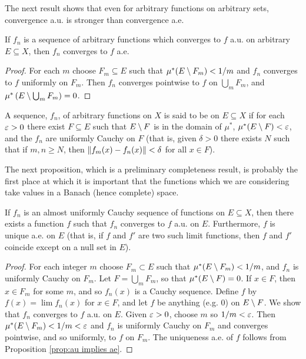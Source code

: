 The next result shows that even for arbitrary functions on arbitrary sets, convergence a.u. is stronger than convergence a.e.

\begin{proposition}\label{prop:au implies ae}
If $f_n$ is a sequence of arbitrary functions which converges to $f$ a.u. on arbitrary $E\subseteq X$, then $f_n$ converges to $f$ a.e.
\end{proposition}

\begin{proof}
For each $m$ choose $F_m\subseteq E$ such that $\mu^*(E\setminus F_m)<1/m$ and $f_n$ converges to $f$ uniformly on $F_m$. Then $f_n$ converges pointwise to $f$ on $\bigcup_mF_m$, and $\mu^*\left(E\setminus\bigcup_m F_m\right)=0$.
\end{proof}

\begin{definition}
A sequence, $f_n$, of arbitrary functions on $X$ is said to be  on $E\subseteq X$ if for each $\varepsilon>0$ there exist $F\subseteq E$ such that $E\setminus F$ is in the domain of $\mu^*$, $\mu^*(E\setminus F)<\varepsilon$, and the $f_n$ are uniformly Cauchy on $F$ (that is, given $\delta>0$ there exists $N$ such that if $m,n\geq N$, then $\norm{f_m(x)-f_n(x)}<\delta$ for all $x\in F$).
\end{definition}

The next proposition, which is a preliminary completeness result, is probably the first place at which it is important that the functions which we are considering take values in a Banach (hence complete) space.

\begin{proposition}\label{prop:au cauchy implies limit}
If $f_n$ is an almost uniformly Cauchy sequence of functions on $E\subseteq X$, then there exists a function $f$ such that $f_n$ converges to $f$ a.u. on $E$. Furthermore, $f$ is unique a.e. on $E$ (that is, if $f$ and $f'$ are two such limit functions, then $f$ and $f'$ coincide except on a null set in $E$).
\end{proposition}

\begin{proof}
For each integer $m$ choose $F_m\subset E$ such that $\mu^*(E\setminus F_m)<1/m$, and $f_n$ is uniformly Cauchy on $F_m$. Let $F=\bigcup_mF_m$, so that $\mu^*(E\setminus F)=0$. If $x\in F$, then $x\in F_m$ for some $m$, and so $f_n(x)$ is a Cauchy sequence. Define $f$ by $f(x)=\lim f_n(x)$ for $x\in F$, and let $f$ be anything (e.g. 0) on $E\setminus F$. We show that $f_n$ converges to $f$ a.u. on $E$. Given $\varepsilon>0$, choose $m$ so $1/m<\varepsilon$. Then $\mu^*(E\setminus F_m)<1/m<\varepsilon$ and $f_n$ is uniformly Cauchy on $F_m$ and converges pointwise, and so uniformly, to $f$ on $F_m$. The uniqueness a.e. of $f$ follows from Proposition \ref{prop:au implies ae}.
\end{proof}

